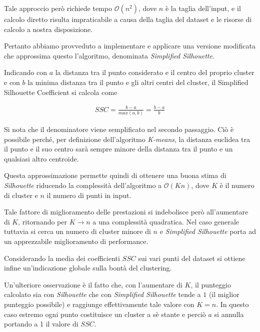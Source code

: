 \documentclass[
	11pt, %
	a4paper, %
	oneside, %
	headinclude,footinclude, %
	BCOR5mm, %
]{scrartcl}
\begin{document}
			Tale approccio però richiede tempo $\mathcal{O}(n^2)$, dove $n$ è la taglia dell'input, e il calcolo diretto risulta impraticabile a causa della taglia del dataset e le risorse di calcolo a nostra disposizione.

			Pertanto abbiamo provveduto a implementare e applicare una versione modificata che approssima questo l'algoritmo, denominata \emph{Simplified Silhouette}\cite{sscmapreduce}.

			Indicando con $a$ la distanza tra il punto considerato e il centro del proprio cluster e con $b$ la minima distanza tra il punto e gli altri centri del cluster, il {Simplified Silhouette Coefficient} si calcola come

			\begin{equation} \begin{aligned} \label{eq:simplifiedSilhouette}
				SSC = \frac{b - a}{ max(a, b) } = \frac{b - a}{b}
			\end{aligned} \end{equation}

			Si nota che il denominatore viene semplificato nel secondo passaggio.
			Ciò è possibile perché, per definizione dell'algoritmo \emph{K-means}, la distanza euclidea tra il punto e il suo centro sarà sempre minore della distanza tra il punto e un qualsiasi altro centroide.


			Questa approssimazione permette quindi di ottenere una buona stima di \emph{Silhouette}\cite{ssc} riducendo la complessità dell'algoritmo a $\mathcal{O}(Kn)$, dove $K$ è il numero di cluster e $n$ il numero di punti in input.

			Tale fattore di miglioramento delle prestazioni si indebolisce però all'aumentare di $K$, ritornando per $K \to n$ a una complessità quadratica.
			Nel caso generale tuttavia si cerca un numero di cluster minore di $n$ e \emph{Simplified Silhouette} porta ad un apprezzabile miglioramento di performance.

			Considerando la media dei coefficienti $SSC$ sui vari punti del dataset si ottiene infine un'indicazione globale sulla bontà del clustering.

			\smallbreak
			Un'ulteriore osservazione è il fatto che, con l'aumentare di $K$, il punteggio calcolato sia con \emph{Silhouette} che con \emph{Simplified Silhouette} tende a $1$ (il miglior punteggio possibile) e raggiunge effettivamente tale valore con $K = n$.
			In questo caso estremo ogni punto costituisce un cluster a sè stante e perciò $a$ si annulla portando a 1 il valore di $SSC$.
\end{document}
